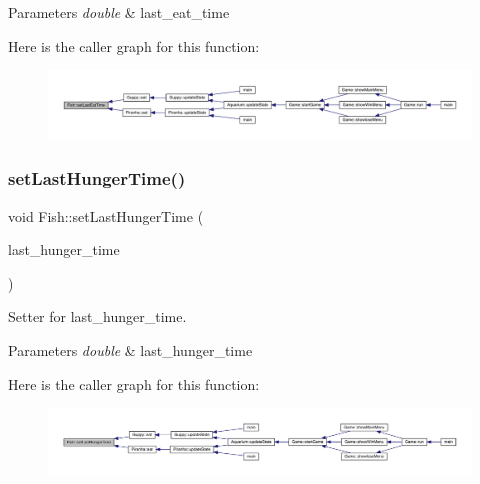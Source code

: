 \begin{DoxyParams}{Parameters}
{\em double} & last\+\_\+eat\+\_\+time \\
\hline
\end{DoxyParams}
Here is the caller graph for this function\+:
\nopagebreak
\begin{figure}[H]
\begin{center}
\leavevmode
\includegraphics[width=350pt]{class_fish_ad53bd870836825ab0cc4b4d987325772_icgraph}
\end{center}
\end{figure}
\mbox{\label{class_fish_aca013c7fba46ca20ab12909945e535d4}} 
\subsubsection{\texorpdfstring{set\+Last\+Hunger\+Time()}{setLastHungerTime()}}
{\footnotesize\ttfamily void Fish\+::set\+Last\+Hunger\+Time (\begin{DoxyParamCaption}\item[{double}]{last\+\_\+hunger\+\_\+time }\end{DoxyParamCaption})}



Setter for last\+\_\+hunger\+\_\+time. 


\begin{DoxyParams}{Parameters}
{\em double} & last\+\_\+hunger\+\_\+time \\
\hline
\end{DoxyParams}
Here is the caller graph for this function\+:
\nopagebreak
\begin{figure}[H]
\begin{center}
\leavevmode
\includegraphics[width=350pt]{class_fish_aca013c7fba46ca20ab12909945e535d4_icgraph}
\end{center}
\end{figure}
\mbox{\label{class_fish_a883d6bd47ac65d319269eee4c46cf461}} 

